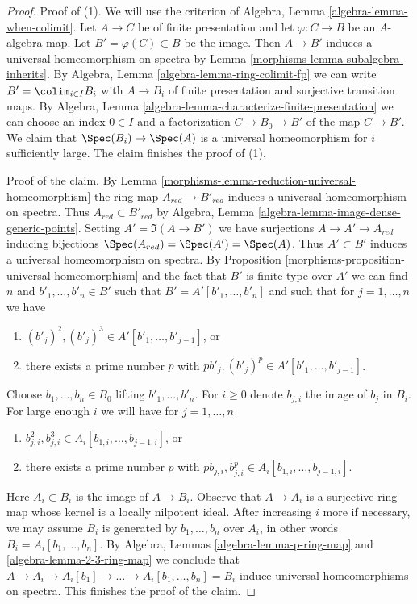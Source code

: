 \begin{proof}

Proof of (1). We will use the criterion of
Algebra, Lemma \ref{algebra-lemma-when-colimit}.
Let $A \to C$ be of finite presentation and let $\varphi : C \to B$
be an $A$-algebra map. Let $B' = \varphi(C) \subset B$ be the image.
Then $A \to B'$ induces a universal homeomorphism on spectra by
Lemma \ref{morphisms-lemma-subalgebra-inherits}.
By Algebra, Lemma \ref{algebra-lemma-ring-colimit-fp}
we can write $B' = \colim_{i \in I} B_i$
with $A \to B_i$ of finite presentation and surjective
transition maps.
By Algebra, Lemma \ref{algebra-lemma-characterize-finite-presentation}
we can choose an index $0 \in I$
and a factorization $C \to B_0 \to B'$ of the map $C \to B'$.
We claim that $\Spec(B_i) \to \Spec(A)$ is a universal homeomorphism
for $i$ sufficiently large. The claim finishes the proof of (1).

\medskip\noindent
Proof of the claim. By Lemma \ref{morphisms-lemma-reduction-universal-homeomorphism}
the ring map $A_{red} \to B'_{red}$ induces a universal homeomorphism
on spectra. Thus $A_{red} \subset B'_{red}$ by
Algebra, Lemma \ref{algebra-lemma-image-dense-generic-points}.
Setting $A' = \Im(A \to B')$ we have surjections $A \to A' \to A_{red}$
inducing bijections $\Spec(A_{red}) = \Spec(A') = \Spec(A)$.
Thus $A' \subset B'$ induces a universal homeomorphism on spectra.
By Proposition \ref{morphisms-proposition-universal-homeomorphism}
and the fact that $B'$ is finite type over $A'$ we can
find $n$ and $b'_1, \ldots, b'_n \in B'$ such that
$B' = A'[b'_1, \ldots, b'_n]$
and such that for $j = 1, \ldots, n$ we have
\begin{enumerate}
\item $(b'_j)^2, (b'_j)^3 \in A'[b'_1, \ldots, b'_{j - 1}]$, or
\item there exists a prime number $p$ with
$pb'_j, (b'_j)^p \in A'[b'_1, \ldots, b'_{j - 1}]$.
\end{enumerate}
Choose $b_1, \ldots, b_n \in B_0$ lifting $b'_1, \ldots, b'_n$.
For $i \geq 0$ denote $b_{j, i}$ the image of $b_j$ in $B_i$.
For large enough $i$ we will have for $j = 1, \ldots, n$
\begin{enumerate}
\item $b_{j, i}^2, b_{j, i}^3 \in A_i[b_{1, i}, \ldots, b_{j - 1, i}]$, or
\item there exists a prime number $p$ with
$pb_{j, i}, b_{j, i}^p \in A_i[b_{1, i}, \ldots, b_{j - 1, i}]$.
\end{enumerate}
Here $A_i \subset B_i$ is the image of $A \to B_i$. Observe that $A \to A_i$
is a surjective ring map whose kernel is a locally nilpotent ideal.
After increasing $i$ more if necessary, we may assume $B_i$
is generated by $b_1, \ldots, b_n$ over $A_i$, in other words
$B_i = A_i[b_1, \ldots, b_n]$.
By Algebra, Lemmas \ref{algebra-lemma-p-ring-map} and
\ref{algebra-lemma-2-3-ring-map} we conclude that
$A \to A_i \to A_i[b_1] \to \ldots \to A_i[b_1, \ldots, b_n] = B_i$
induce universal homeomorphisms on spectra. This finishes the proof
of the claim.


\end{proof}

